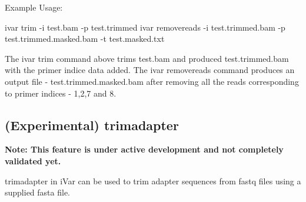 Example Usage\+: 
\begin{DoxyCode}
ivar trim -i test.bam -p test.trimmed
ivar removereads -i test.trimmed.bam -p test.trimmed.masked.bam -t test.masked.txt
\end{DoxyCode}


The {\ttfamily ivar trim} command above trims test.\+bam and produced test.\+trimmed.\+bam with the primer indice data added. The {\ttfamily ivar removereads} command produces an output file -\/ test.\+trimmed.\+masked.\+bam after removing all the reads corresponding to primer indices -\/ 1,2,7 and 8.\hypertarget{manualpage_autotoc_md8}{}\subsection{(\+Experimental) trimadapter}\label{manualpage_autotoc_md8}
{\bfseries Note\+: This feature is under active development and not completely validated yet.}

trimadapter in i\+Var can be used to trim adapter sequences from fastq files using a supplied fasta file. 
